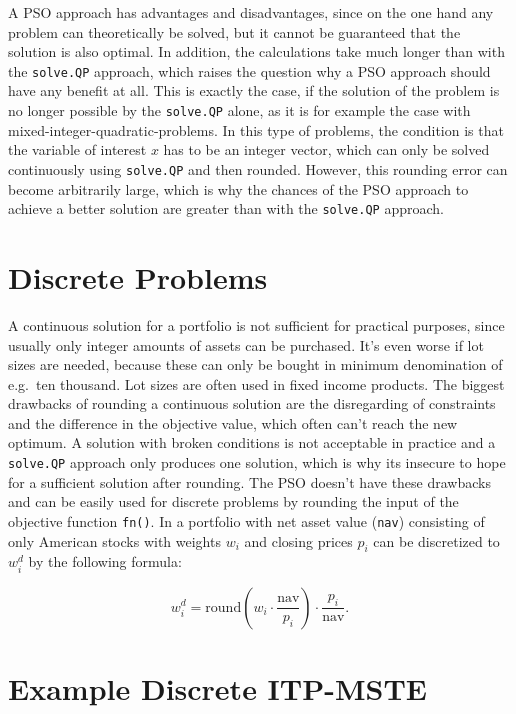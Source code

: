 \documentclass[
  oneside, a4paper, 12pt, openany]{book}
\theoremstyle{definition}
\theoremstyle{definition}
\theoremstyle{definition}
\theoremstyle{definition}
\theoremstyle{remark}
\begin{document}
A PSO approach has advantages and disadvantages, since on the one hand any problem can theoretically be solved, but it cannot be guaranteed that the solution is also optimal. In addition, the calculations take much longer than with the \texttt{solve.QP} approach, which raises the question why a PSO approach should have any benefit at all. This is exactly the case, if the solution of the problem is no longer possible by the \texttt{solve.QP} alone, as it is for example the case with mixed-integer-quadratic-problems. In this type of problems, the condition is that the variable of interest \(x\) has to be an integer vector, which can only be solved continuously using \texttt{solve.QP} and then rounded. However, this rounding error can become arbitrarily large, which is why the chances of the PSO approach to achieve a better solution are greater than with the \texttt{solve.QP} approach.

\hypertarget{discrete-problems}{%
\section{Discrete Problems}\label{discrete-problems}}

A continuous solution for a portfolio is not sufficient for practical purposes, since usually only integer amounts of assets can be purchased. It's even worse if lot sizes are needed, because these can only be bought in minimum denomination of e.g.~ten thousand. Lot sizes are often used in fixed income products. The biggest drawbacks of rounding a continuous solution are the disregarding of constraints and the difference in the objective value, which often can't reach the new optimum. A solution with broken conditions is not acceptable in practice and a \texttt{solve.QP} approach only produces one solution, which is why its insecure to hope for a sufficient solution after rounding. The PSO doesn't have these drawbacks and can be easily used for discrete problems by rounding the input of the objective function \texttt{fn()}. In a portfolio with net asset value (\texttt{nav}) consisting of only American stocks with weights \(w_i\) and closing prices \(p_i\) can be discretized to \(w_i^d\) by the following formula:

\[
  w_i^d =\text{round}(w_i \cdot \frac{\text{nav}}{p_i})\cdot \frac{p_i}{\text{nav}}.
\]

\hypertarget{example-discrete-itp-mste}{%
\section{Example Discrete ITP-MSTE}\label{example-discrete-itp-mste}}
\end{document}

